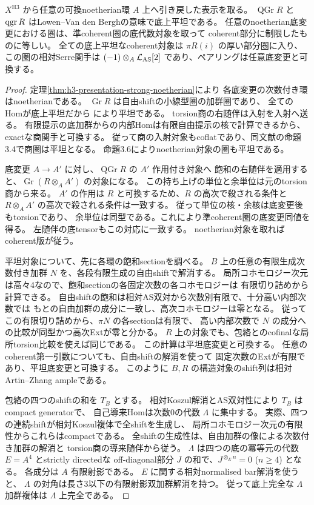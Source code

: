 \begin{theorem}\label{thm:h3-relative-flat-coherent-serre-global}
$X^{\mathrm{H3}}$ から任意の可換noetherian環 $A$ 上へ引き戻した表示を取る。
$\operatorname{QGr}R$ と $\operatorname{qgr} R$ はLowen--Van den Berghの意味で底上平坦である。
任意のnoetherian底変更における圏は、準coherent圏の底代数対象を取って
coherent部分に制限したものに等しい。
全ての底上平坦なcoherent対象は $\pi R(i)$ の厚い部分圏に入り、
この圏の相対Serre関手は
$(-1)\otimes_A\mathcal L_{\rm AS}[2]$ であり、ペアリングは任意底変更と可換する。
\end{theorem}
\begin{proof}
定理\ref{thm:h3-presentation-strong-noetherian}により
各底変更の次数付き環はnoetherianである。
$\operatorname{Gr}R$ は自由shiftの小線型圏の加群圏であり、
全てのHomが底上平坦だから
\cite[命題3.7]{LowenVdBFlatAbelian}により平坦である。
torsion商の右随伴は入射を入射へ送る。
有限提示の底加群からの内部Homは有限自由提示の核で計算できるから、
exactな商関手と可換する。
従って商の入射対象もcoflatであり、同文献の命題3.4で商圏は平坦となる。
命題3.6によりnoetherian対象の圏も平坦である。

底変更 $A\to A'$ に対し、$\operatorname{QGr}R$ の $A'$ 作用付き対象へ
飽和の右随伴を適用すると、$\operatorname{Gr}(R\otimes_A A')$ の対象になる。
この持ち上げの単位と余単位は元のtorsion商から来る。
$A'$ の作用は $R$ と可換するため、$R$ の高次で殺される条件と
$R\otimes_A A'$ の高次で殺される条件は一致する。
従って単位の核・余核は底変更後もtorsionであり、
余単位は同型である。これにより準coherent圏の底変更同値を得る。
左随伴の底tensorもこの対応に一致する。
noetherian対象を取ればcoherent版が従う。

平坦対象について、先に各環の飽和sectionを調べる。
$B$ 上の任意の有限生成次数付き加群 $N$ を、各段有限生成の自由shiftで解消する。
局所コホモロジー次元は高々4なので、飽和sectionの各固定次数の各コホモロジーは
有限切り詰めから計算できる。
自由shiftの飽和は相対AS双対から次数別有限で、十分高い内部次数では
もとの自由加群の成分に一致し、高次コホモロジーは零となる。
従ってこの有限切り詰めから、$\pi N$ の各sectionは有限で、
高い内部次数で $N$ の成分への比較が同型かつ高次Extが零と分かる。
$R$ 上の対象でも、包絡とのcofinalな局所torsion比較を使えば同じである。
この計算は平坦底変更と可換する。
任意のcoherent第一引数についても、自由shiftの解消を使って
固定次数のExtが有限であり、平坦底変更と可換する。
このように $B,R$ の構造対象のshift列は相対Artin--Zhang ampleである。

包絡の四つのshiftの和を $T_B$ とする。
相対Koszul解消とAS双対性により $T_B$ はcompact generatorで、
自己導来Homは次数0の代数 $\Lambda$ に集中する。
実際、四つの連続shiftが相対Koszul複体で全shiftを生成し、
局所コホモロジー次元の有限性からこれらはcompactである。
全shiftの生成性は、自由加群の像による次数付き加群の解消と
torsion商の導来随伴から従う。
$\Lambda$ は四つの底の冪等元の代数 $E=A^4$ とstrictly directedな
off-diagonal部分 $J$ の和で、$J^{\otimes_E n}=0$ ($n\ge4$) となる。
各成分は $A$ 有限射影である。
$E$ に関する相対normalised bar解消を使うと、
$\Lambda$ の対角は長さ3以下の有限射影双加群解消を持つ。
従って底上完全な $\Lambda$ 加群複体は $\Lambda$ 上完全である。


\end{proof}
